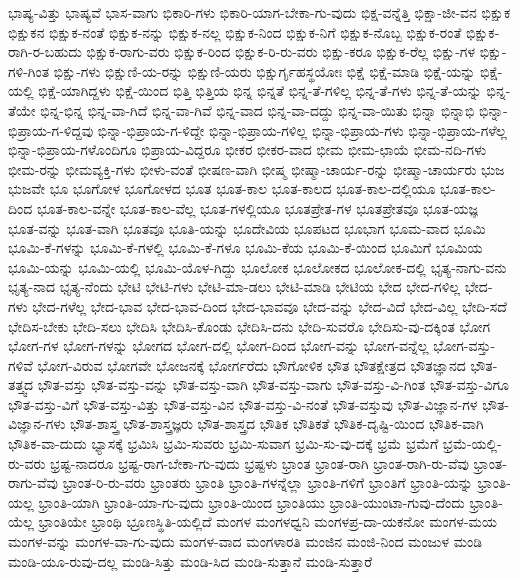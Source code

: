 {ಭಾಷ್ಯ-ವಿತ್ತು
ಭಾಷ್ಯವೆ
ಭಾಸ-ವಾಗು
ಭಿಕಾರಿ-ಗಳು
ಭಿಕಾರಿ-ಯಾಗ-ಬೇಕಾ-ಗು-ವುದು
ಭಿಕ್ಷ-ವನ್ನೆತ್ತಿ
ಭಿಕ್ಷಾ-ಜೀ-ವನ
ಭಿಕ್ಷುಕ
ಭಿಕ್ಷುಕನ
ಭಿಕ್ಷುಕ-ನಂತೆ
ಭಿಕ್ಷುಕ-ನನ್ನು
ಭಿಕ್ಷುಕ-ನಲ್ಲ
ಭಿಕ್ಷುಕ-ನಿಂದ
ಭಿಕ್ಷುಕ-ನಿಗೆ
ಭಿಕ್ಷುಕ-ನೊಬ್ಬ
ಭಿಕ್ಷುಕ-ರಂತೆ
ಭಿಕ್ಷುಕ-ರಾಗಿ-ರ-ಬಹುದು
ಭಿಕ್ಷುಕ-ರಾಗು-ವರು
ಭಿಕ್ಷುಕ-ರಿಂದ
ಭಿಕ್ಷುಕ-ರಿ-ರು-ವರು
ಭಿಕ್ಷು-ಕರೂ
ಭಿಕ್ಷುಕ-ರೆಲ್ಲ
ಭಿಕ್ಷು-ಗಳ
ಭಿಕ್ಷು-ಗಳಿ-ಗಿಂತ
ಭಿಕ್ಷು-ಗಳು
ಭಿಕ್ಷುಣಿ-ಯ-ರನ್ನು
ಭಿಕ್ಷುಣಿ-ಯರು
ಭಿಕ್ಷುರ್ಗೃಹಸ್ಥಯೋಃ
ಭಿಕ್ಷೆ
ಭಿಕ್ಷೆ-ಮಾಡಿ
ಭಿಕ್ಷೆ-ಯನ್ನು
ಭಿಕ್ಷೆ-ಯಲ್ಲಿ
ಭಿಕ್ಷೆ-ಯಾಗಿದ್ದಳು
ಭಿಕ್ಷೆ-ಯಿಂದ
ಭಿತ್ತಿ
ಭಿತ್ತಿಯ
ಭಿನ್ನ
ಭಿನ್ನತೆ
ಭಿನ್ನ-ತೆ-ಗಳಿಲ್ಲ
ಭಿನ್ನ-ತೆ-ಗಳು
ಭಿನ್ನ-ತೆ-ಯನ್ನು
ಭಿನ್ನ-ತೆಯೇ
ಭಿನ್ನ-ಭಿನ್ನ
ಭಿನ್ನ-ವಾ-ಗಿದೆ
ಭಿನ್ನ-ವಾ-ಗಿವೆ
ಭಿನ್ನ-ವಾದ
ಭಿನ್ನ-ವಾ-ದದ್ದು
ಭಿನ್ನ-ವಾ-ಯಿತು
ಭಿನ್ನಾ
ಭಿನ್ನಾಭಿ
ಭಿನ್ನಾ-ಭಿಪ್ರಾಯ-ಗ-ಳಿದ್ದವು
ಭಿನ್ನಾ-ಭಿಪ್ರಾಯ-ಗ-ಳಿದ್ದೇ
ಭಿನ್ನಾ-ಭಿಪ್ರಾಯ-ಗಳಿಲ್ಲ
ಭಿನ್ನಾ-ಭಿಪ್ರಾಯ-ಗಳು
ಭಿನ್ನಾ-ಭಿಪ್ರಾಯ-ಗಳೆಲ್ಲ
ಭಿನ್ನಾ-ಭಿಪ್ರಾಯ-ಗಳೊಂದಿಗೂ
ಭಿಪ್ರಾಯ-ವಿದ್ದರೂ
ಭೀಕರ
ಭೀಕರ-ವಾದ
ಭೀಮ
ಭೀಮ-ಛಾಯೆ
ಭೀಮ-ನದಿ-ಗಳು
ಭೀಮ-ರನ್ನು
ಭೀಮವ್ಯಕ್ತಿ-ಗಳು
ಭೀಳು-ವಂತೆ
ಭೀಷಣ-ವಾಗಿ
ಭೀಷ್ಮ
ಭೀಷ್ಮಾ-ಚಾರ್ಯ-ರನ್ನು
ಭೀಷ್ಮಾ-ಚಾರ್ಯರು
ಭುಜ
ಭುಜವೇ
ಭೂ
ಭೂಗೋಳ
ಭೂಗೋಳದ
ಭೂತ
ಭೂತ-ಕಾಲ
ಭೂತ-ಕಾಲದ
ಭೂತ-ಕಾಲ-ದಲ್ಲಿಯೂ
ಭೂತ-ಕಾಲ-ದಿಂದ
ಭೂತ-ಕಾಲ-ವನ್ನೇ
ಭೂತ-ಕಾಲ-ವೆಲ್ಲ
ಭೂತ-ಗಳಲ್ಲಿಯೂ
ಭೂತಪ್ರೇತ-ಗಳ
ಭೂತಪ್ರೇತವೂ
ಭೂತ-ಯಜ್ಞ
ಭೂತ-ವನ್ನು
ಭೂತ-ವಾಗಿ
ಭೂತವೂ
ಭೂತಿ-ಯನ್ನು
ಭೂದೇವಿಯ
ಭೂಪಟದ
ಭೂಭಾಗ
ಭೂಮ-ವಾದ
ಭೂಮಿ
ಭೂಮಿ-ಕೆ-ಗಳನ್ನು
ಭೂಮಿ-ಕೆ-ಗಳಲ್ಲಿ
ಭೂಮಿ-ಕೆ-ಗಳೂ
ಭೂಮಿ-ಕೆಯ
ಭೂಮಿ-ಕೆ-ಯಿಂದ
ಭೂಮಿಗೆ
ಭೂಮಿಯ
ಭೂಮಿ-ಯನ್ನು
ಭೂಮಿ-ಯಲ್ಲಿ
ಭೂಮಿ-ಯೊಳ-ಗಿದ್ದು
ಭೂಲೋಕ
ಭೂಲೋಕದ
ಭೂಲೋಕ-ದಲ್ಲಿ
ಭೃತ್ಯ-ನಾಗು-ವನು
ಭೃತ್ಯ-ನಾದ
ಭೃತ್ಯ-ನೆಂದು
ಭೇಟಿ
ಭೇಟಿ-ಗಳು
ಭೇಟಿ-ಮಾ-ಡಲು
ಭೇಟಿ-ಮಾಡಿ
ಭೇಟಿಯ
ಭೇದ
ಭೇದ-ಗಳಿಲ್ಲ
ಭೇದ-ಗಳು
ಭೇದ-ಗಳೆಲ್ಲ
ಭೇದ-ಭಾವ
ಭೇದ-ಭಾವ-ದಿಂದ
ಭೇದ-ಭಾವವೂ
ಭೇದ-ವನ್ನು
ಭೇದ-ವಿದೆ
ಭೇದ-ವಿಲ್ಲ
ಭೇದಿ-ಸದೆ
ಭೇದಿಸ-ಬೇಕು
ಭೇದಿ-ಸಲು
ಭೇದಿಸಿ
ಭೇದಿಸಿ-ಕೊಂಡು
ಭೇದಿಸಿ-ದನು
ಭೇದಿ-ಸುವರೊ
ಭೇದಿಸು-ವು-ದಕ್ಕಿಂತ
ಭೋಗ
ಭೋಗ-ಗಳ
ಭೋಗ-ಗಳನ್ನು
ಭೋಗದ
ಭೋಗ-ದಲ್ಲಿ
ಭೋಗ-ದಿಂದ
ಭೋಗ-ವನ್ನು
ಭೋಗ-ವನ್ನೆಲ್ಲ
ಭೋಗ-ವಸ್ತು-ಗಳಿವೆ
ಭೋಗ-ವಿರುವ
ಭೋಗವೇ
ಭೋಜನಕ್ಕೆ
ಭೋರ್ಗರೆದು
ಭೌಗೋಳಿಕ
ಭೌತ
ಭೌತಕ್ಷೇತ್ರದ
ಭೌತಜ್ಞಾನದ
ಭೌತ-ತತ್ತ್ವದ
ಭೌತ-ವಸ್ತು
ಭೌತ-ವಸ್ತು-ವನ್ನು
ಭೌತ-ವಸ್ತು-ವಾಗಿ
ಭೌತ-ವಸ್ತು-ವಾಗು
ಭೌತ-ವಸ್ತು-ವಿ-ಗಿಂತ
ಭೌತ-ವಸ್ತು-ವಿಗೂ
ಭೌತ-ವಸ್ತು-ವಿಗೆ
ಭೌತ-ವಸ್ತು-ವಿತ್ತು
ಭೌತ-ವಸ್ತು-ವಿನ
ಭೌತ-ವಸ್ತು-ವಿ-ನಂತೆ
ಭೌತ-ವಸ್ತುವು
ಭೌತ-ವಿಜ್ಞಾನ-ಗಳ
ಭೌತ-ವಿಜ್ಞಾನ-ಗಳು
ಭೌತ-ಶಾಸ್ತ್ರ
ಭೌತ-ಶಾಸ್ತ್ರಜ್ಞರು
ಭೌತ-ಶಾಸ್ತ್ರದ
ಭೌತಿಕ
ಭೌತಿಕತೆ
ಭೌತಿಕ-ದೃಷ್ಟಿ-ಯಿಂದ
ಭೌತಿಕ-ವಾಗಿ
ಭೌತಿಕ-ವಾ-ದುದು
ಭ್ಯಾಸಕ್ಕೆ
ಭ್ರಮಿಸಿ
ಭ್ರಮಿ-ಸುವರು
ಭ್ರಮಿ-ಸುವಾಗ
ಭ್ರಮಿ-ಸು-ವು-ದಕ್ಕೆ
ಭ್ರಮೆ
ಭ್ರಮೆಗೆ
ಭ್ರಮೆ-ಯಲ್ಲಿ-ರು-ವರು
ಭ್ರಷ್ಟ-ನಾದರೂ
ಭ್ರಷ್ಟ-ರಾಗ-ಬೇಕಾ-ಗು-ವುದು
ಭ್ರಷ್ಟಳು
ಭ್ರಾಂತ
ಭ್ರಾಂತ-ರಾಗಿ
ಭ್ರಾಂತ-ರಾಗಿ-ರು-ವೆವು
ಭ್ರಾಂತ-ರಾಗು-ವೆವು
ಭ್ರಾಂತ-ರಿ-ರು-ವರು
ಭ್ರಾಂತರು
ಭ್ರಾಂತಿ
ಭ್ರಾಂತಿ-ಗಳನ್ನೆಲ್ಲಾ
ಭ್ರಾಂತಿ-ಗಳಿಗೆ
ಭ್ರಾಂತಿಗೆ
ಭ್ರಾಂತಿ-ಯನ್ನು
ಭ್ರಾಂತಿ-ಯಲ್ಲ
ಭ್ರಾಂತಿ-ಯಾಗಿ
ಭ್ರಾಂತಿ-ಯಾ-ಗು-ವುದು
ಭ್ರಾಂತಿ-ಯಿಂದ
ಭ್ರಾಂತಿಯು
ಭ್ರಾಂತಿ-ಯುಂಟಾ-ಗುವು-ದೆಂದು
ಭ್ರಾಂತಿ-ಯೆಲ್ಲ
ಭ್ರಾಂತಿಯೇ
ಭ್ರಾಂಥಿ
ಭ್ರೂಣಸ್ಥಿತಿ-ಯಲ್ಲಿದೆ
ಮಂಗಳ
ಮಂಗಳಧ್ವನಿ
ಮಂಗಳಪ್ರ-ದಾ-ಯಕನೋ
ಮಂಗಳ-ಮಯ
ಮಂಗಳ-ವನ್ನು
ಮಂಗಳ-ವಾ-ಗು-ವುದು
ಮಂಗಳ-ವಾದ
ಮಂಗಳಾರತಿ
ಮಂಜಿನ
ಮಂಜಿ-ನಿಂದ
ಮಂಜುಳ
ಮಂಡಿ
ಮಂಡಿ-ಯೂ-ರುವು-ದಲ್ಲ
ಮಂಡಿ-ಸಿತ್ತು
ಮಂಡಿ-ಸಿದ
ಮಂಡಿ-ಸುತ್ತಾನೆ
ಮಂಡಿ-ಸುತ್ತಾರೆ
}
